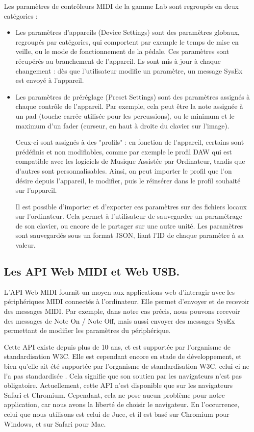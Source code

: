 \documentclass[francais]{rapportPFE}  %
\begin{document}
Les paramètres de contrôleurs MIDI de la gamme Lab sont regroupés en deux catégories :
\begin{itemize}
    \item Les paramètres d'appareils (Device Settings) sont des paramètres globaux, regroupés par catégories, qui comportent par exemple le temps de mise en veille, ou le mode de fonctionnement de la pédale. Ces paramètres sont récupérés au branchement de l'appareil. Ils sont mis à jour à chaque changement : dès que l'utilisateur modifie un paramètre, un message SysEx est envoyé à l'appareil.
    \item Les paramètres de préréglage (Preset Settings) sont des paramètres assignés à chaque contrôle de l'appareil. Par exemple, cela peut être la note assignée à un pad (touche carrée utilisée pour les percussions), ou le minimum et le maximum d'un fader (curseur, en haut à droite du clavier sur l'image). 
    
    Ceux-ci sont assignés à des "profils" : en fonction de l'appareil, certains sont prédéfinis et non modifiables, comme par exemple le profil DAW qui est compatible avec les logiciels de Musique Assistée par Ordinateur, tandis que d'autres sont personnalisables. Ainsi, on peut importer le profil que l'on désire depuis l'appareil, le modifier, puis le réinsérer dans le profil souhaité sur l'appareil. 

    Il est possible d'importer et d'exporter ces paramètres sur des fichiers locaux sur l'ordinateur. Cela permet à l'utilisateur de sauvegarder un paramétrage de son clavier, ou encore de le partager sur une autre unité. Les paramètres sont sauvegardés sous un format JSON, liant l'ID de chaque paramètre à sa valeur.
\end{itemize}

\subsection{Les API Web MIDI et Web USB.}

L'API Web MIDI \cite{webmidi1}
fournit un moyen aux applications web d'interagir avec les périphériques MIDI connectés à l'ordinateur. Elle permet d'envoyer et de recevoir des messages MIDI. Par exemple, dans notre cas précis, nous pouvons recevoir des messages de Note On / Note Off, mais aussi envoyer des messages SysEx permettant de modifier les paramètres du périphérique.

Cette API existe depuis plus de 10 ans, et est supportée par l'organisme de standardisation W3C. Elle est cependant encore en stade de développement, et bien qu'elle ait été supportée par l'organisme de standardisation W3C, celui-ci ne l'a pas standardisée \cite{webmidi2}. Cela signifie que son soutien par les navigateurs n'est pas obligatoire. Actuellement, cette API n'est disponible que sur les navigateurs Safari et Chromium. Cependant, cela ne pose aucun problème pour notre application, car nous avons la liberté de choisir le navigateur. En l'occurrence, celui que nous utilisons est celui de Juce, et il est basé sur Chromium pour Windows, et sur Safari pour Mac.
\end{document}
